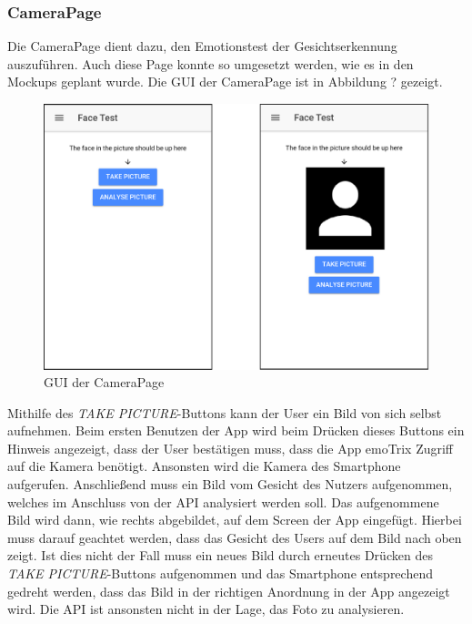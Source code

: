 \subsubsection{CameraPage}
Die CameraPage dient dazu, den Emotionstest der Gesichtserkennung auszuführen. Auch diese Page konnte so umgesetzt werden, wie es in den Mockups geplant wurde. Die GUI der CameraPage ist in Abbildung ? gezeigt. \newline
\begin{figure}[h]
	\centering
	\includegraphics[width=13.5cm]{Bilder/camerapage.png}
	\caption[GUI der CameraPage]{GUI der CameraPage}
\end{figure}%
\newline
Mithilfe des \textit{TAKE PICTURE}-Buttons kann der User ein Bild von sich selbst aufnehmen. Beim ersten Benutzen der App wird beim Drücken dieses Buttons ein Hinweis angezeigt, dass der User bestätigen muss, dass die App emoTrix Zugriff auf die Kamera benötigt. Ansonsten wird die Kamera des Smartphone aufgerufen. Anschließend muss ein Bild vom Gesicht des Nutzers aufgenommen, welches im Anschluss von der API analysiert werden soll. Das aufgenommene Bild wird dann, wie rechts abgebildet, auf dem Screen der App eingefügt. Hierbei muss darauf geachtet werden, dass das Gesicht des Users auf dem Bild nach oben zeigt. Ist dies nicht der Fall muss ein neues Bild durch erneutes Drücken des \textit{TAKE PICTURE}-Buttons aufgenommen und das Smartphone entsprechend gedreht werden, dass das Bild in der richtigen Anordnung in der App angezeigt wird. Die API ist ansonsten nicht in der Lage, das Foto zu analysieren. \newline

